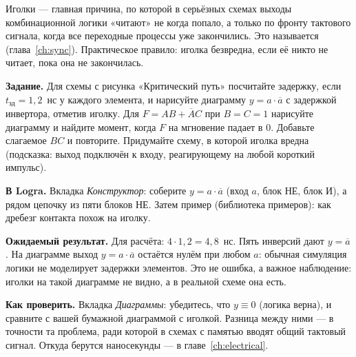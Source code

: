 \begin{warnbox}
Иголки --- главная причина, по которой в серьёзных схемах выходы
комбинационной логики «читают» не когда попало, а только по фронту
тактового сигнала, когда все переходные процессы уже закончились. Это
называется  (глава~\ref{ch:sync}).
Практическое правило: иголка безвредна, если её никто не читает, пока она
не закончилась.
\end{warnbox}

\begin{diybox}
\textbf{Задание.}  Для схемы с рисунка «Критический путь»
посчитайте задержку, если $t_\text{зд}=1{,}2$~нс у каждого элемента, и
нарисуйте диаграмму $y=a\cdot\overline a$ с задержкой инвертора, отметив
иголку.  Для $F=AB+\overline{A}C$ при $B=C=1$ нарисуйте диаграмму
и найдите момент, когда $F$ на мгновение падает в 0. Добавьте слагаемое
$BC$ и повторите.  Придумайте схему, в которой иголка вредна
(подсказка: выход подключён к входу, реагирующему на любой короткий
импульс).

\textbf{В Logra.} Вкладка \emph{Конструктор}: соберите $y=a\cdot\overline a$
(вход $a$, блок НЕ, блок И), а рядом цепочку из пяти блоков НЕ. Затем
пример  (библиотека примеров): как дребезг контакта
похож на иголку.

\textbf{Ожидаемый результат.} Для расчёта: $4\cdot 1{,}2 = 4{,}8$~нс. Пять
инверсий дают $y=\overline a$. На диаграмме выход $y=a\cdot\overline a$
остаётся нулём при любом $a$: обычная симуляция логики не моделирует
задержки элементов. Это не ошибка, а важное наблюдение: иголки на такой
диаграмме не видно, а в реальной схеме она есть.

\textbf{Как проверить.} Вкладка \emph{Диаграммы}: убедитесь, что $y\equiv0$
(логика верна), и сравните с вашей бумажной диаграммой с иголкой. Разница
между ними --- в точности та проблема, ради которой в схемах с памятью
вводят общий тактовый сигнал. Откуда берутся наносекунды --- в
главе~\ref{ch:electrical}.
\end{diybox}

